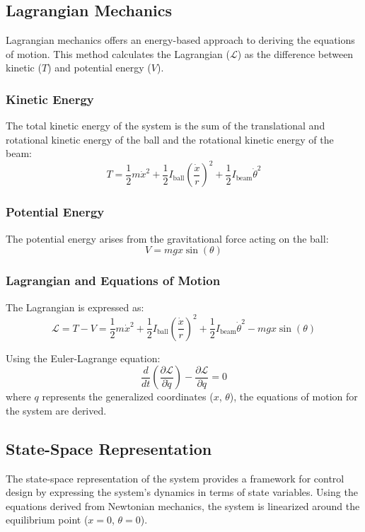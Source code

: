 \documentclass[conference]{IEEEtran}
\begin{document}
\subsection{Lagrangian Mechanics}
Lagrangian mechanics offers an energy-based approach to deriving the equations of motion. This method calculates the Lagrangian (\(\mathcal{L}\)) as the difference between kinetic (\(T\)) and potential energy (\(V\)).

\subsubsection{Kinetic Energy}
The total kinetic energy of the system is the sum of the translational and rotational kinetic energy of the ball and the rotational kinetic energy of the beam:
\begin{equation}
T = \frac{1}{2}m\dot{x}^2 + \frac{1}{2}I_{\text{ball}}\left(\frac{\dot{x}}{r}\right)^2 + \frac{1}{2}I_{\text{beam}}\dot{\theta}^2
\end{equation}

\subsubsection{Potential Energy}
The potential energy arises from the gravitational force acting on the ball:
\begin{equation}
V = m g x \sin(\theta)
\end{equation}

\subsubsection{Lagrangian and Equations of Motion}
The Lagrangian is expressed as:
\begin{equation}
\mathcal{L} = T - V = \frac{1}{2}m\dot{x}^2 + \frac{1}{2}I_{\text{ball}}\left(\frac{\dot{x}}{r}\right)^2 + \frac{1}{2}I_{\text{beam}}\dot{\theta}^2 - m g x \sin(\theta)
\end{equation}

Using the Euler-Lagrange equation:
\begin{equation}
\frac{d}{dt}\left(\frac{\partial \mathcal{L}}{\partial \dot{q}}\right) - \frac{\partial \mathcal{L}}{\partial q} = 0
\end{equation}
where \(q\) represents the generalized coordinates (\(x\), \(\theta\)), the equations of motion for the system are derived.

\subsection{State-Space Representation}
The state-space representation of the system provides a framework for control design by expressing the system's dynamics in terms of state variables. Using the equations derived from Newtonian mechanics, the system is linearized around the equilibrium point (\(x = 0\), \(\theta = 0\)).
\end{document}
